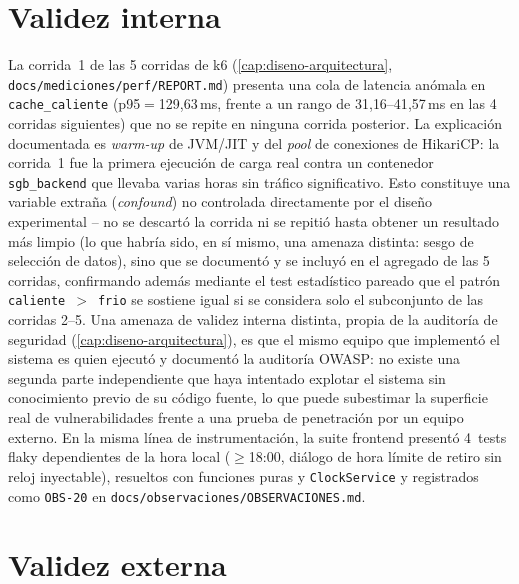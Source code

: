 \section{Validez interna}

La corrida~1 de las 5 corridas de k6 (\autoref{cap:diseno-arquitectura},
\texttt{docs/mediciones/perf/REPORT.md}) presenta una cola de latencia
anómala en \texttt{cache\_caliente} (p95$=$129{,}63\,ms, frente a un
rango de 31{,}16--41{,}57\,ms en las 4 corridas siguientes) que no se
repite en ninguna corrida posterior. La explicación documentada es
\emph{warm-up} de JVM/JIT y del \emph{pool} de conexiones de HikariCP:
la corrida~1 fue la primera ejecución de carga real contra un contenedor
\texttt{sgb\_backend} que llevaba varias horas sin tráfico significativo.
Esto constituye una variable extraña (\emph{confound}) no controlada
directamente por el diseño experimental -- no se descartó la corrida ni
se repitió hasta obtener un resultado más limpio (lo que habría sido, en
sí mismo, una amenaza distinta: sesgo de selección de datos), sino que
se documentó y se incluyó en el agregado de las 5 corridas, confirmando
además mediante el test estadístico pareado que el patrón
\texttt{caliente}~$>$~\texttt{frio} se sostiene igual si se considera
solo el subconjunto de las corridas 2--5. Una amenaza de validez interna
distinta, propia de la auditoría de seguridad
(\autoref{cap:diseno-arquitectura}), es que el mismo equipo que
implementó el sistema es quien ejecutó y documentó la auditoría OWASP: no
existe una segunda parte independiente que haya intentado explotar el
sistema sin conocimiento previo de su código fuente, lo que puede
subestimar la superficie real de vulnerabilidades frente a una prueba de
penetración por un equipo externo. En la misma línea de instrumentación,
la suite frontend presentó 4~tests flaky dependientes de la hora local
($\geq$18:00, diálogo de hora límite de retiro sin reloj inyectable),
resueltos con funciones puras y \texttt{ClockService} y registrados como
\texttt{OBS-20} en \texttt{docs/observaciones/OBSERVACIONES.md}.

\section{Validez externa}
\label{sec:validez-externa}

